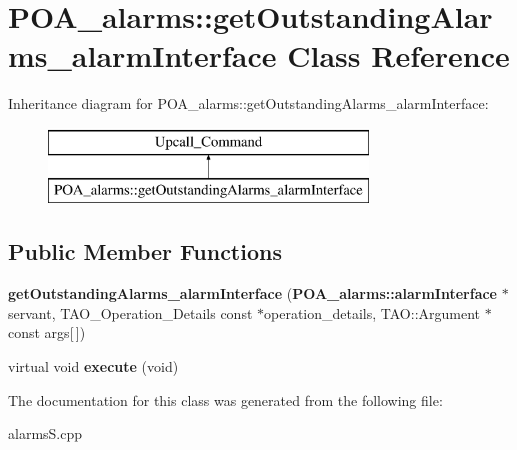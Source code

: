 \section{P\+O\+A\+\_\+alarms\+:\+:get\+Outstanding\+Alarms\+\_\+alarm\+Interface Class Reference}
\label{classPOA__alarms_1_1getOutstandingAlarms__alarmInterface}
Inheritance diagram for P\+O\+A\+\_\+alarms\+:\+:get\+Outstanding\+Alarms\+\_\+alarm\+Interface\+:\begin{figure}[H]
\begin{center}
\leavevmode
\includegraphics[height=2.000000cm]{classPOA__alarms_1_1getOutstandingAlarms__alarmInterface}
\end{center}
\end{figure}
\subsection*{Public Member Functions}
\begin{DoxyCompactItemize}
\item 
{\bfseries get\+Outstanding\+Alarms\+\_\+alarm\+Interface} ({\bf P\+O\+A\+\_\+alarms\+::alarm\+Interface} $\ast$servant, T\+A\+O\+\_\+\+Operation\+\_\+\+Details const $\ast$operation\+\_\+details, T\+A\+O\+::\+Argument $\ast$const args[$\,$])\label{classPOA__alarms_1_1getOutstandingAlarms__alarmInterface_ad8174f42e38ba186495b0c44b0456ee2}

\item 
virtual void {\bfseries execute} (void)\label{classPOA__alarms_1_1getOutstandingAlarms__alarmInterface_ac2328813b46c3f8602e2390054929b86}

\end{DoxyCompactItemize}


The documentation for this class was generated from the following file\+:\begin{DoxyCompactItemize}
\item 
alarms\+S.\+cpp\end{DoxyCompactItemize}
